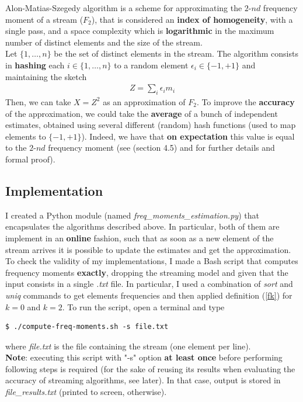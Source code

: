 Alon-Matias-Szegedy algorithm is a scheme for approximating the $2\text{-}nd$ frequency moment of a stream ($F_2$), that is considered an \textbf{index of homogeneity}, with a single pass, and a space complexity which is \textbf{logarithmic} in the maximum number of distinct elements and the size of the stream.\\
Let $\{1,\ldots,n\}$ be the set of distinct elements in the stream. The algorithm consists in \textbf{hashing} each $i \in \{1,\ldots,n\}$ to a random element $\epsilon_i \in \{-1,+1\}$ and maintaining the sketch
\begin{align*}
	Z = \sum_{i} \epsilon_i m_i
\end{align*}
Then, we can take $X = Z^2$ as an approximation of $F_2$. To improve the \textbf{accuracy} of the approximation, we could take the \textbf{average} of a bunch of independent estimates, obtained using several different (random) hash functions (used to map elements to $\{-1,+1\}$). Indeed, we have that \textbf{on expectation} this value is equal to the $2\text{-}nd$ frequency moment (see \cite{mmd} (section 4.5) and \cite{dm-streams} for further details and formal proof).


\subsection{Implementation}

I created a Python module (named \textit{freq\_moments\_estimation.py}) that encapsulates the algorithms described above. In particular, both of them are implement in an \textbf{online} fashion, such that as soon as a new element of the stream arrives it is possible to update the estimates and get the approximation.\\
To check the validity of my implementations, I made a Bash script that computes frequency moments \textbf{exactly}, dropping the streaming model and given that the input consists in a single \textit{.txt} file. In particular, I used a combination of \textit{sort} and \textit{uniq} commands to get elements frequencies and then applied definition (\ref{fk}) for $k = 0$ and $k = 2$. To run the script, open a terminal and type
\begin{lstlisting}
$ ./compute-freq-moments.sh -s file.txt
\end{lstlisting}
where \textit{file.txt} is the file containing the stream (one element per line).\\ 
\textbf{Note}: executing this script with "-s" option \textbf{at least once} before performing following steps is required (for the sake of reusing its results when evaluating the accuracy of streaming algorithms, see later). In that case, output is stored in \textit{file\_results.txt} (printed to screen, otherwise).\\

